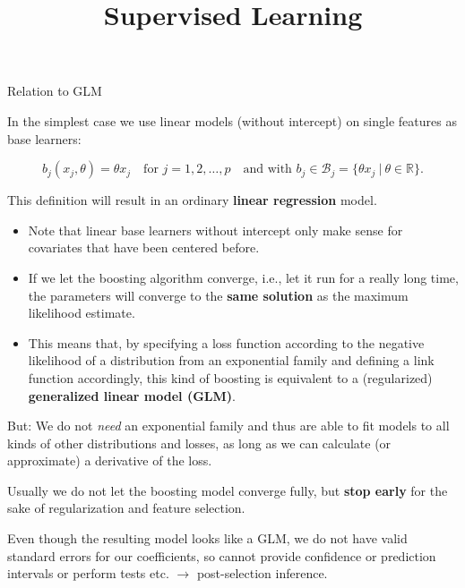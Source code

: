 \documentclass[11pt,compress,t,notes=noshow, xcolor=table]{beamer}
\title{Supervised Learning}\date{}
\begin{document}


\begin{vbframe}{Relation to GLM}

In the simplest case we use linear models (without intercept) on single features
as base learners:

$$
  b_j(x_j,\theta) = \theta x_j  \quad \text{for } j = 1, 2, \dots, p \quad
  \text{and with } b_j \in \mathcal{B}_j = \{\theta x_j  ~\rvert~ \theta \in
  \mathbb{R} \}.
$$


This definition will result in an ordinary \textbf{linear regression} model.



\begin{itemize}
  \item Note that linear base learners without intercept only make sense for
  covariates that have been centered before.
  \item If we let the boosting algorithm converge, i.e., let it run for a really
  long time, the parameters will converge to the \textbf{same solution} as the
  maximum likelihood estimate.
  \item This means that, by specifying a loss function according to the negative
  likelihood of a distribution from an exponential family and defining a link
  function accordingly, this kind of boosting is equivalent to a (regularized)
  \textbf{generalized linear model (GLM)}.
\end{itemize}

\framebreak


But: We do not \emph{need} an exponential family and thus are able to fit models
to all kinds of other distributions and losses, as long as we can calculate (or
approximate) a derivative of the loss.

\lz

Usually we do not let the boosting model converge fully, but \textbf{stop
early} for the sake of regularization and feature selection.

\lz

Even though the resulting model looks like a GLM, we do not have valid standard
errors for our coefficients,
so cannot provide confidence or prediction intervals or perform tests etc.
$\rightarrow$ post-selection inference.

\end{vbframe}
\end{document}
